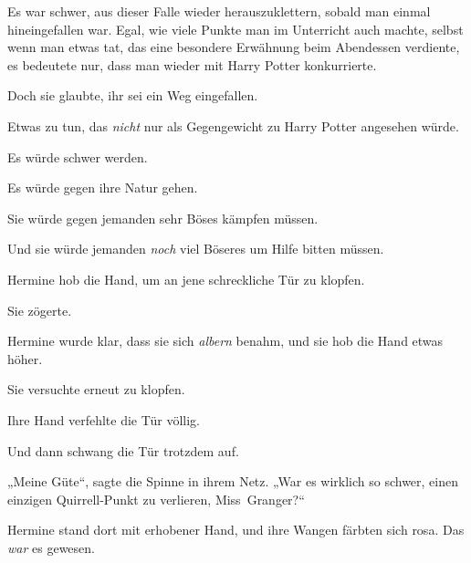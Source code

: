 Es war schwer, aus dieser Falle wieder herauszuklettern, sobald man einmal hineingefallen war. Egal, wie viele Punkte man im Unterricht auch machte, selbst wenn man etwas tat, das eine besondere Erwähnung beim Abendessen verdiente, es bedeutete nur, dass man wieder mit Harry Potter konkurrierte.

Doch sie glaubte, ihr sei ein Weg eingefallen.

Etwas zu tun, das \emph{nicht} nur als Gegengewicht zu Harry Potter angesehen würde.

Es würde schwer werden.

Es würde gegen ihre Natur gehen.

Sie würde gegen jemanden sehr Böses kämpfen müssen.

Und sie würde jemanden \emph{noch} viel Böseres um Hilfe bitten müssen.

Hermine hob die Hand, um an jene schreckliche Tür zu klopfen.

Sie zögerte.

Hermine wurde klar, dass sie sich \emph{albern} benahm, und sie hob die Hand etwas höher.

Sie versuchte erneut zu klopfen.

Ihre Hand verfehlte die Tür völlig.

Und dann schwang die Tür trotzdem auf.

„Meine Güte“, sagte die Spinne in ihrem Netz.
„War es wirklich so schwer, einen einzigen Quirrell-Punkt zu verlieren, Miss~Granger?“

Hermine stand dort mit erhobener Hand, und ihre Wangen färbten sich rosa. Das \emph{war} es gewesen.

